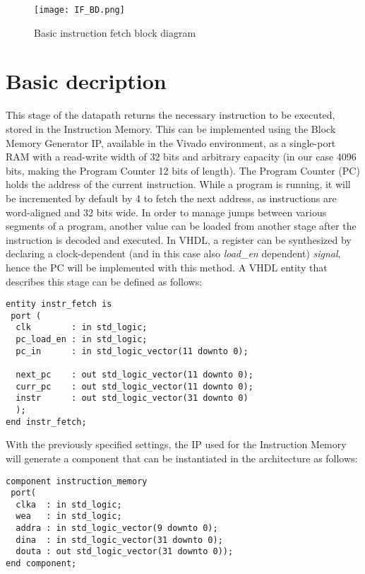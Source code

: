 \begin{figure}[ht!]
  \centering
  \texttt{[image: IF\_BD.png]}
  \caption{Basic instruction fetch block diagram}
  \label{fig:IF_BD}
\end{figure}
\section{Basic decription}
This stage of the datapath returns the necessary instruction to be executed, stored in the Instruction Memory. This can be implemented using the Block Memory Generator IP, available in the Vivado environment, as a single-port RAM with a read-write width of 32 bits and arbitrary capacity (in our case 4096 bits, making the Program Counter 12 bits of length).
The Program Counter (PC) holds the address of the current instruction. While a program is running, it will be incremented by default by 4 to fetch the next address, as instructions are word-aligned and 32 bits wide. In order to manage jumps between various segments of a program, another value can be loaded from another stage after the instruction is decoded and executed.
In VHDL, a register can be synthesized by declaring a clock-dependent (and in this case also \emph{load{\_}en} dependent) \emph{signal}, hence the PC will be implemented with this method.
A VHDL entity that describes this stage can be defined as follows:\\
\begin{verbatim}
entity instr_fetch is
 port ( 
  clk        : in std_logic;
  pc_load_en : in std_logic;
  pc_in      : in std_logic_vector(11 downto 0);
       
  next_pc    : out std_logic_vector(11 downto 0);
  curr_pc    : out std_logic_vector(11 downto 0);
  instr      : out std_logic_vector(31 downto 0)
  );
end instr_fetch;
\end{verbatim}
\vspace{1\baselineskip}
With the previously specified settings, the IP used for the Instruction Memory will generate a component that can be instantiated in the architecture as follows:\\
\begin{verbatim}
component instruction_memory
 port(
  clka  : in std_logic;
  wea   : in std_logic;
  addra : in std_logic_vector(9 downto 0);
  dina  : in std_logic_vector(31 downto 0);
  douta : out std_logic_vector(31 downto 0));
end component;
\end{verbatim}
\vspace{1\baselineskip}
